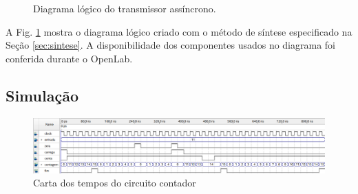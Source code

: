 \documentclass[a4,12pt]{horizon-theme}
\begin{document}
\begin{figure}[!ht]
    \centering
    \caption{Diagrama lógico do transmissor assíncrono.}
    \label{fig:diagrama-logico}
\end{figure}

A Fig. \ref{fig:diagrama-logico} mostra o diagrama lógico criado com o método de síntese especificado na Seção \ref{sec:sintese}. A disponibilidade dos componentes usados no diagrama foi conferida durante o OpenLab.


\subsection{Simulação}

\begin{figure}
    \centering
    \includegraphics[width=\textwidth]{contador}
    \caption{Carta dos tempos do circuito contador}
    \label{fig:ct_contador}
\end{figure}
\end{document}
